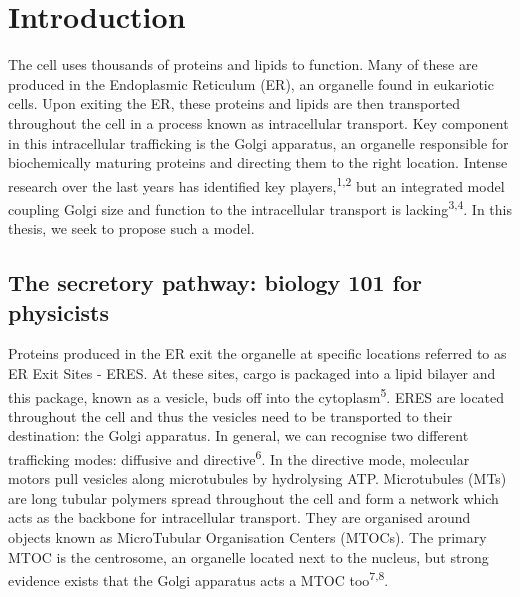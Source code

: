\documentclass{Dissertate}
\begin{document}
\newpage


\tableofcontents

\newpage

\setcounter{page}{1}
\hypertarget{introduction}{%
\chapter{Introduction}\label{introduction}}

The cell uses thousands of proteins and lipids to function. Many of
these are produced in the Endoplasmic Reticulum (ER), an organelle found
in eukariotic cells. Upon exiting the ER, these proteins and lipids are
then transported throughout the cell in a process known as intracellular
transport. Key component in this intracellular trafficking is the Golgi
apparatus, an organelle responsible for biochemically maturing proteins
and directing them to the right location. Intense research over the last
years has identified key players,\textsuperscript{1,2}
but an integrated model coupling Golgi size and function to the
intracellular transport is
lacking\textsuperscript{3,4}. In this thesis, we seek
to propose such a model.

\hypertarget{the-secretory-pathway-biology-101-for-physicists}{%
\section{The secretory pathway: biology 101 for
physicists}\label{the-secretory-pathway-biology-101-for-physicists}}

Proteins produced in the ER exit the organelle at specific locations
referred to as ER Exit Sites - ERES. At these sites, cargo is packaged
into a lipid bilayer and this package, known as a vesicle, buds off into
the cytoplasm\textsuperscript{5}. ERES are located throughout the cell
and thus the vesicles need to be transported to their destination: the
Golgi apparatus. In general, we can recognise two different trafficking
modes: diffusive and directive\textsuperscript{6}. In the directive
mode, molecular motors pull vesicles along microtubules by hydrolysing
ATP. Microtubules (MTs) are long tubular polymers spread throughout the
cell and form a network which acts as the backbone for intracellular
transport. They are organised around objects known as MicroTubular
Organisation Centers (MTOCs). The primary MTOC is the centrosome, an
organelle located next to the nucleus, but strong evidence exists that
the Golgi apparatus acts a MTOC
too\textsuperscript{7,8}.
\end{document}
